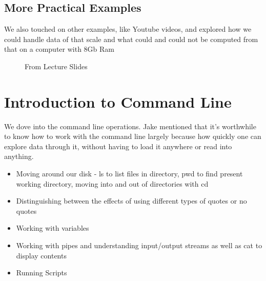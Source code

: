 \subsection{More Practical Examples}
We also touched on other examples, like Youtube videos, and explored how we could handle data of that scale and what could and could not be computed from that on a computer with 8Gb Ram \\


\begin{figure}[h!]
  \begin{center}
\caption{
      From Lecture Slides
      }
\end{center}
\end{figure}

     
     
\section{Introduction to Command Line}
We dove into the command line operations. Jake mentioned that it's worthwhile to know how to work with the command line largely because how quickly one can explore data through it, without having to load it anywhere or read into anything.
\begin{itemize}
  \item Moving around our disk - ls to list files in directory, pwd to find present working directory, moving into and out of directories with cd
  \item Distinguishing between the effects of using different types of quotes or no quotes
  \item Working with variables
  \item Working with pipes and understanding input/output streams as well as cat to display contents
  \item Running Scripts
\end{itemize}


